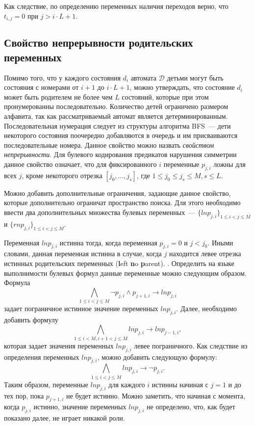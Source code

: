 Как следствие, по определению переменных наличия переходов верно, что $t_{i, j} = 0$ при $j > i \cdot L + 1$.



\subsection{Свойство непрерывности родительских переменных}
\label{sec:space:pruning:continuity}

Помимо того, что у каждого состояния $d_{i}$ автомата $\mathcal{D}$ детьми могут быть состояния с номерами от $i + 1$ до $i \cdot L + 1$, можно утверждать, что состояние $d_{i}$ может быть родителем не более чем $L$ состояний, которые при этом пронумерованны последовательно.
Количество детей ограничено размером алфавита, так как рассматриваемый автомат является детерминированным.
Последовательная нумерация следует из структуры алгоритма BFS~{---} дети некоторого состояния поочередно добавляются в очередь и им присваиваются последовательные номера.
Данное свойство можно назвать \emph{свойством непрерывности}.
Для булевого кодирования предикатов нарушения симметрии данное свойство означает, что для фиксированного $i$ переменные $p_{j,i}$ ложны для всех $j$, кроме некоторого отрезка $[j_{0},\ldots,j_{s}]$, где $1 \leq j_{0} \leq j_{s} \leq M, s\leq L$.

Можно добавить дополнительные ограничения, задающие данное свойство, которые дополнительно ограничат пространство поиска.
Для этого необходимо ввести два дополнительных множества булевых переменных~{---} $\{\mathit{lnp}_{j,i}\}_{1 \leq i < j \leq M}$ и  $\{\mathit{rnp}_{j,i}\}_{1 \leq i < j \leq M}$.

Переменная $\mathit{lnp}_{j,i}$ истинна тогда, когда переменная $p_{j,i} = 0$ и $j < j_{0}$.
Иными словами, данная переменная истинна в случае, когда $j$ находится левее отрезка истинных родительских переменных (\textbf{l}eft \textbf{n}o \textbf{p}arent).
.
Определить на языке выполнимости булевых формул данные переменные можно следующим образом.
Формула $$\bigwedge_{1 \leq i < j \leq M} \neg p_{j,i} \wedge p_{j + 1, i} \rightarrow \mathit{lnp}_{j,i}$$ задает пограничное истинное значение переменных $\mathit{lnp}_{j,i}$.
Далее, необходимо добавить формулу $$\bigwedge_{1 \leq i < M, i + 1 < j \leq M} \mathit{lnp}_{j,i} \rightarrow \mathit{lnp}_{j - 1, i},$$
которая задает значения переменных $\mathit{lnp}_{j,i}$ левее пограничного.
Как следствие из определения переменных $\mathit{lnp}_{j,i}$, можно добавить следующую формулу: $$\bigwedge_{1 \leq i < j \leq M} \mathit{lnp}_{j,i} \rightarrow \neg p_{j,i}.$$
Таким образом, переменные $\mathit{lnp}_{j,i}$ для каждого $i$ истинны начиная с $j = 1$ и до тех пор, пока $p_{j + 1, i}$ не будет истинно.
Можно заметить, что начиная с момента, когда $p_{j,i}$ истинно, значение переменных $\mathit{lnp}_{j,i}$ не определено, что, как будет показано далее, не играет никакой роли.

